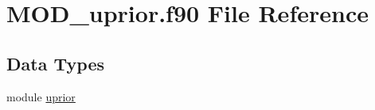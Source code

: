 \hypertarget{MOD__uprior_8f90}{\section{M\-O\-D\-\_\-uprior.\-f90 File Reference}
\label{MOD__uprior_8f90}
}
\subsection*{Data Types}
\begin{DoxyCompactItemize}
\item 
module \hyperlink{classuprior}{uprior}
\end{DoxyCompactItemize}
